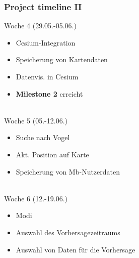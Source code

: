 \documentclass[xcolor=dvipsnames]{beamer}
\begin{document}
\begin{frame}
	\frametitle{\textbf{Project timeline II}}
	\Large{Woche 4 (29.05.-05.06.)}
	\normalsize		
	~\\
	\begin{itemize}
		\item \color{Green} Cesium-Integration
		\item \color{Green} Speicherung von Kartendaten
		\item \color{Green} Datenvis. in Cesium
		\item \color{Green} \textbf{Milestone 2} erreicht
	\end{itemize}			
	~\\
	\Large{Woche 5 (05.-12.06.)}
	\normalsize		
	~\\
	\begin{itemize}
		\item \color{Green} Suche nach Vogel
		\item \color{Green} Akt. Position auf Karte
		\item \color{Red} Speicherung von Mb-Nutzerdaten
	\end{itemize}		
	~\\
	\Large{Woche 6 (12.-19.06.)}
	\normalsize		
	~\\
	\begin{itemize}
		\item \color{Red} Modi 
		\item \color{Red} Auswahl des Vorhersagezeitraums
		\item \color{Red} Auswahl von Daten für die Vorhersage
	\end{itemize}		
\end{frame}
\end{document}
